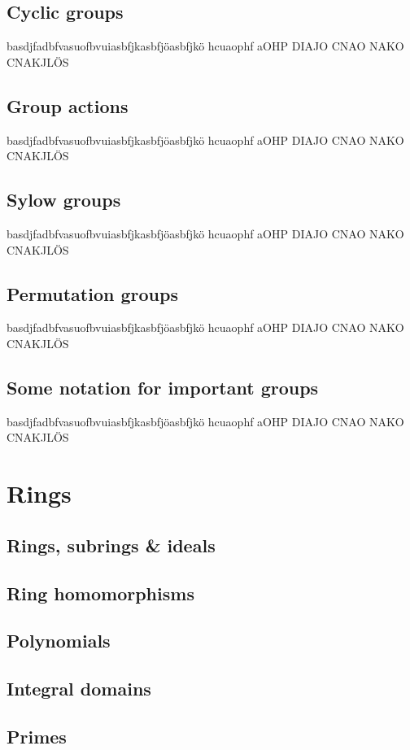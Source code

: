 \documentclass[a4paper]{article}
\begin{document}
\subsection{Cyclic groups}
basdjfadbfvasuofbvuiasbfjkasbfjöasbfjkö hcuaophf aOHP DIAJO CNAO NAKO CNAKJLÖS

\subsection{Group actions}
basdjfadbfvasuofbvuiasbfjkasbfjöasbfjkö hcuaophf aOHP DIAJO CNAO NAKO CNAKJLÖS

\subsection{Sylow groups}
basdjfadbfvasuofbvuiasbfjkasbfjöasbfjkö hcuaophf aOHP DIAJO CNAO NAKO CNAKJLÖS

\subsection{Permutation groups}
basdjfadbfvasuofbvuiasbfjkasbfjöasbfjkö hcuaophf aOHP DIAJO CNAO NAKO CNAKJLÖS

\subsection{Some notation for important groups}
basdjfadbfvasuofbvuiasbfjkasbfjöasbfjkö hcuaophf aOHP DIAJO CNAO NAKO CNAKJLÖS

\section{Rings}
\subsection{Rings, subrings \& ideals}
\subsection{Ring homomorphisms}
\subsection{Polynomials}
\subsection{Integral domains}
\subsection{Primes}
\end{document}
